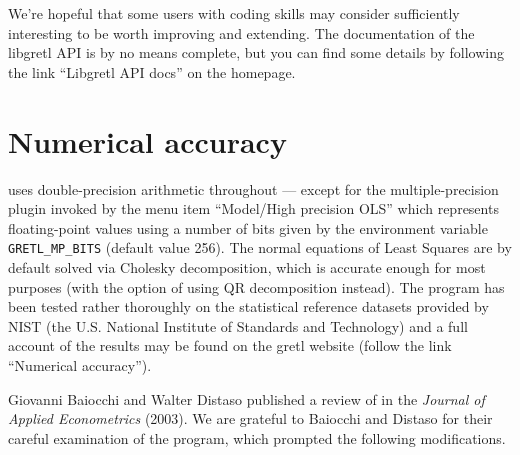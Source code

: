 We're hopeful that some users with coding skills may consider
 sufficiently interesting to be worth improving and
extending.  The documentation of the libgretl API is by no means
complete, but you can find some details by following the link
``Libgretl API docs'' on the  homepage.

\chapter{Numerical accuracy}
\label{app-accuracy}

 uses double-precision arithmetic throughout --- except for
the multiple-precision plugin invoked by the menu item ``Model/High
precision OLS'' which represents floating-point values using a number
of bits given by the environment variable \verb+GRETL_MP_BITS+
(default value 256).  The normal equations of Least Squares are by
default solved via Cholesky decomposition, which is accurate enough
for most purposes (with the option of using QR decomposition instead).
The program has been tested rather thoroughly on the statistical
reference datasets provided by NIST (the U.S. National Institute of
Standards and Technology) and a full account of the results may be
found on the gretl website (follow the link ``Numerical accuracy'').

Giovanni Baiocchi and Walter Distaso published a review of 
in the \emph{Journal of Applied Econometrics} (2003).  We are grateful
to Baiocchi and Distaso for their careful examination of the program,
which prompted the following modifications.

